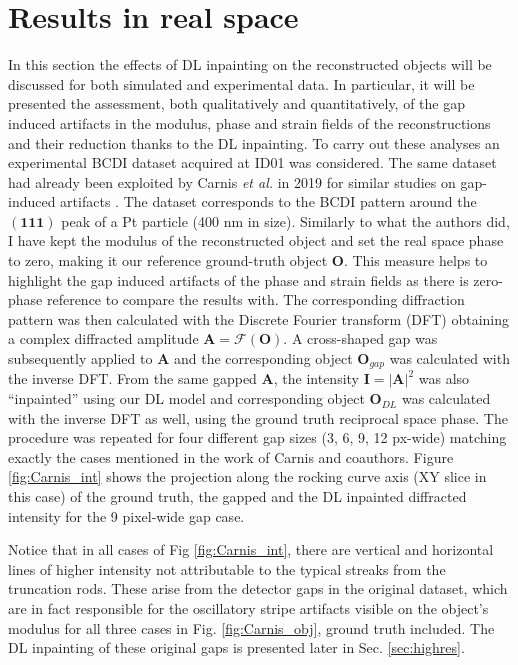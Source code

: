 \section{Results in real space}\label{sec:res_real}

In this section the effects of DL inpainting on the reconstructed objects will be discussed for both simulated and experimental 
data. In particular, it will be presented the assessment, both qualitatively and quantitatively, of the gap induced artifacts in 
the modulus, phase and strain fields of the reconstructions and their reduction thanks to the DL inpainting. To carry out
these analyses an experimental BCDI dataset acquired at ID01 was considered. The same dataset had already been exploited by 
Carnis \textit{et al.} in 2019 for similar studies on gap-induced artifacts \cite{carnis_towards_2019}. The dataset 
corresponds to the BCDI pattern around the $(\mathbf{111})$ peak of a Pt particle (400 nm in size). 
Similarly to what the authors did, I have kept the modulus of the reconstructed object and set the real space phase
to zero, making it our reference ground-truth object $\textbf{O}$. This measure helps to highlight the gap induced artifacts 
of the phase and strain fields as there is zero-phase 
reference to compare the results with. The corresponding diffraction pattern was then calculated with the Discrete
Fourier transform (DFT) obtaining a complex diffracted amplitude $\mathbf{A}=\mathcal{F}(\mathbf{O})$. A cross-shaped gap was 
subsequently applied to $\mathbf{A}$ and the corresponding object $\mathbf{O}_{gap}$ was calculated with the inverse DFT.
From the same gapped $\mathbf{A}$, the intensity $\mathbf{I} = |\mathbf{A}|^2$ was also ``inpainted'' using our DL model 
and corresponding object $\mathbf{O}_{DL}$ was calculated with the inverse DFT as well, using the ground truth reciprocal 
space phase. The procedure was repeated for four different gap sizes (3, 6, 9, 12 px-wide) matching exactly the cases 
mentioned in the work of Carnis and coauthors. Figure \ref{fig:Carnis_int} shows the projection along the rocking curve 
axis (XY slice in this case) of the ground truth, the gapped and the DL inpainted diffracted intensity for the 
9 pixel-wide gap case. 

Notice that in all cases of Fig \ref{fig:Carnis_int}, there are vertical and horizontal lines of higher intensity not attributable 
to the typical streaks from the truncation rods. These arise from the detector gaps in the original dataset, which are in 
fact responsible for the oscillatory stripe artifacts visible on the object's modulus for all three cases in Fig. 
\ref{fig:Carnis_obj}, ground truth included. The DL inpainting of these original gaps is presented later in Sec. \ref{sec:highres}. 

